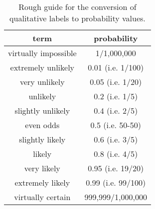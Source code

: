 \begin{table}
\begin{tabular}{cc}
term & probability \\\hline\hline
virtually impossible & 1/1,000,000\\
extremely unlikely & 0.01 (i.e. 1/100) \\
very unlikely & 0.05 (i.e. 1/20) \\
unlikely & 0.2 (i.e. 1/5) \\
slightly unlikely & 0.4 (i.e. 2/5) \\
even odds & 0.5 (i.e. 50-50) \\
slightly likely & 0.6 (i.e. 3/5) \\
likely & 0.8 (i.e. 4/5) \\
very likely & 0.95 (i.e. 19/20) \\
extremely likely & 0.99 (i.e. 99/100) \\
virtually certain & 999,999/1,000,000
\end{tabular}
\label{table1}
\caption{Rough guide for the conversion of qualitative labels to probability values. }
\end{table}

